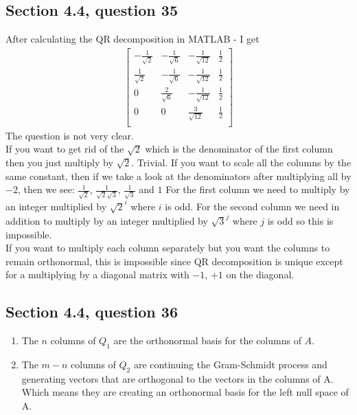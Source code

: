 \documentclass[a4paper,11pt]{article}
\begin{document}
\subsection*{Section 4.4, question 35}
After calculating the QR decomposition in MATLAB - I get 
\begin{align*}
\begin{bmatrix}
-\frac{1}{\sqrt{2}} & -\frac{1}{\sqrt{6}} & -\frac{1}{\sqrt{12}} & \frac{1}{2}\\
\frac{1}{\sqrt{2}} & -\frac{1}{\sqrt{6}} & -\frac{1}{\sqrt{12}} & \frac{1}{2}\\
0 & \frac{2}{\sqrt{6}} & -\frac{1}{\sqrt{12}} & \frac{1}{2}\\
0 & 0 & \frac{3}{\sqrt{12}} & \frac{1}{2}\\
\end{bmatrix}
\end{align*}
The question is not very clear. \\
If you want to get rid of the $\sqrt{2}$ which is the denominator of the first column then you just multiply by $\sqrt{2}$. Trivial.
If you want to scale all the columns by the same constant, then if we take a look at the denominators after multiplying all by $-2$, then we see: $\frac{1}{\sqrt{2}}$, $\frac{1}{\sqrt{2}\sqrt{3}}$, $\frac{1}{\sqrt{3}}$ and $1$
For the first column we need to multiply by an integer multiplied by ${\sqrt{2}^i}$ where $i$ is odd. For the second column we need in addition to multiply by an integer multiplied by ${\sqrt{3}^j}$ where $j$ is odd so this is impossible.\\
If you want to multiply each column separately but you want the columns to remain orthonormal, this is impossible since QR decomposition is unique except for a multiplying by a diagonal matrix with $-1$, $+1$ on the diagonal.
\subsection*{Section 4.4, question 36}
\begin{enumerate}
\item The $n$ columns of $Q_1$ are the orthonormal basis for the columns of $A$.
\item The $m-n$ columns of $Q_2$ are continuing the Gram-Schmidt process and generating vectors that are orthogonal to the vectors in the columns of A. Which means they are creating an orthonormal basis for the left null space of A.
\end{enumerate}
\end{document}
